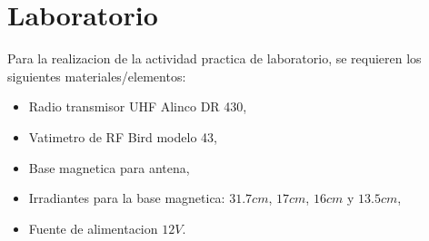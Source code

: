 \chapter{Laboratorio}
  Para la realizacion de la actividad practica de laboratorio, se requieren los siguientes materiales/elementos:
  \begin{itemize}
    \item Radio transmisor UHF Alinco DR 430,
    \item Vatimetro de RF Bird modelo 43,
    \item Base magnetica para antena,
    \item Irradiantes para la base magnetica: $31.7cm$, $17cm$, $16cm$ y $13.5cm$,
    \item Fuente de alimentacion $12V$.
  \end{itemize}
